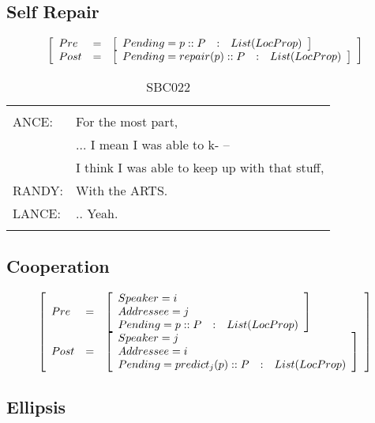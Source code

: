 \documentclass[11pt]{article}
\newenvironment{sbcquote}[2]
{
	\def\savedcaption{\caption{#1}}%
	\def\savedlabel{\label{#2}}%
	\begin{table}[h]
		\centering
		\begin{small}
		\begin{tabular}{ll}
			\hline
			& \\
}
{
	& \\
	\hline
	\end{tabular}
	\end{small}
	\savedcaption
	\savedlabel
\end{table}
}
\newenvironment{recenv}
{\left[\begin{array}{lll}}
{\end{array}\right]}
\begin{document}
		\subsection{Self Repair}
			\begin{equation*}
			\begin{recenv}
			Pre  &=& \begin{recenv}
			Pending = p :: P &:& List(LocProp)\\
			\end{recenv}\\
			Post &=& \begin{recenv}
			Pending = repair(p) :: P &:& List(LocProp)
			\end{recenv}
			\end{recenv}
			\end{equation*}
			\begin{sbcquote}{SBC022}
				LANCE:&	For the most part,\\
				&... I mean I was able to k- --\\
				&I think I was able to keep up with that stuff,\\
				RANDY:&	With the ARTS.\\
				LANCE:&	.. Yeah.\\
			\end{sbcquote}

		\subsection{Cooperation}
			\begin{equation*}
			\begin{recenv}
			Pre  &=& \begin{recenv}
			Speaker = i\\
			Addressee = j\\
			Pending = p :: P &:& List(LocProp)\\
			\end{recenv}\\
			Post &=& \begin{recenv}
			Speaker = j\\
			Addressee = i\\
			Pending = predict_j(p) :: P &:& List(LocProp)
			\end{recenv}
			\end{recenv}
			\end{equation*}
		\subsection{Ellipsis}
\end{document}
